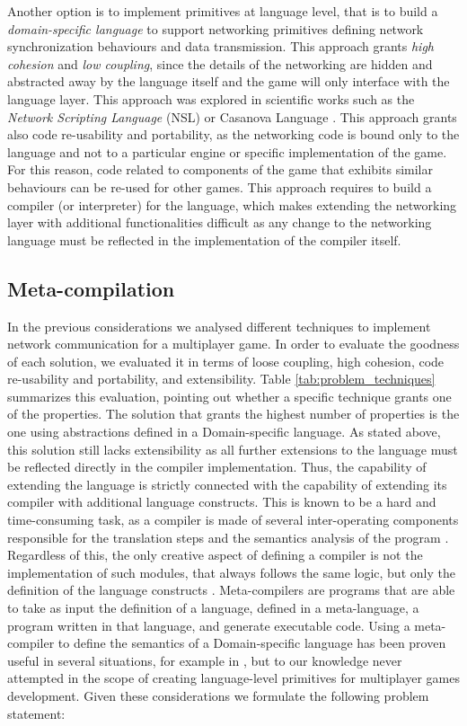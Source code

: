 Another option is to implement primitives at language level, that is to build a \textit{domain-specific language} to support networking primitives defining network synchronization behaviours and data transmission. This approach grants \textit{high cohesion} and \textit{low coupling}, since the details of the networking are hidden and abstracted away by the language itself and the game will only interface with the language layer. This approach was explored in scientific works such as the \textit{Network Scripting Language} (NSL) \cite{russell2008tackling} or Casanova Language \cite{DiGiacomo201725}. This approach grants also code re-usability and portability, as the networking code is bound only to the language and not to a particular engine or specific implementation of the game. For this reason, code related to components of the game that exhibits similar behaviours can be re-used for other games. This approach requires to build a compiler (or interpreter) for the language, which makes extending the networking layer with additional functionalities difficult as any change to the networking language must be reflected in the implementation of the compiler itself.

\subsection{Meta-compilation}

In the previous considerations we analysed different techniques to implement network communication for a multiplayer game. In order to evaluate the goodness of each solution, we evaluated it in terms of loose coupling, high cohesion, code re-usability and portability, and extensibility. Table \ref{tab:problem_techniques} summarizes this evaluation, pointing out whether a specific technique grants one of the properties. The solution that grants the highest number of properties is the one using abstractions defined in a Domain-specific language. As stated above, this solution still lacks extensibility as all further extensions to the language must be reflected directly in the compiler implementation. Thus, the capability of extending the language is strictly connected with the capability of extending its compiler with additional language constructs. This is known to be a hard and time-consuming task, as a compiler is made of several inter-operating components responsible for the translation steps and the semantics analysis of the program \cite{aho1986compilers, kaagedal1998generating}. Regardless of this, the only creative aspect of defining a compiler is not the implementation of such modules, that always follows the same logic, but only the definition of the language constructs \cite{BookShorre}. Meta-compilers are programs that are able to take as input the definition of a language, defined in a meta-language, a program written in that language, and generate executable code. Using a meta-compiler to define the semantics of a Domain-specific language has been proven useful in several situations, for example in \cite{kaagedal1998generating, DiGiacomo2017}, but to our knowledge never attempted in the scope of creating language-level primitives for multiplayer games development. Given these considerations we formulate the following problem statement:

